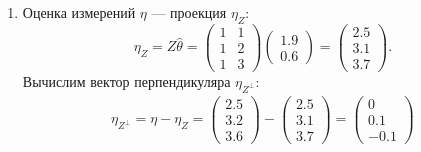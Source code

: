 \documentclass[a4paper,12pt]{article}
\newcommand{\pr}[2]{#1_{#2}}
\newcommand{\pro}[2]{#1_{#2^\perp}}
\begin{document}
\begin{enumerate}
    \item
          Оценка измерений $\eta$ --- проекция $\pr{\eta}{Z}$:
          \[
              \pr{\eta}{Z}
              = Z \widehat{\theta}
              =  \begin{pmatrix}
                  1 & 1 \\
                  1 & 2 \\
                  1 & 3
              \end{pmatrix}
              \begin{pmatrix}
                  1.9 \\
                  0.6
              \end{pmatrix}
              = \begin{pmatrix}
                  2.5 \\
                  3.1 \\
                  3.7
              \end{pmatrix} .
          \]
          Вычислим вектор перпендикуляра $\pro{\eta}{Z}$:
          \begin{gather*}
              \pro{\eta}{Z}
              = \eta - \pr{\eta}{Z}
              =
              \begin{pmatrix}
                  2.5 \\
                  3.2 \\
                  3.6
              \end{pmatrix}
              -
              \begin{pmatrix}
                  2.5 \\
                  3.1 \\
                  3.7
              \end{pmatrix}
              = \begin{pmatrix}
                  0   \\
                  0.1 \\
                  - 0.1
              \end{pmatrix}
          \end{gather*}


\end{enumerate}
\end{document}
